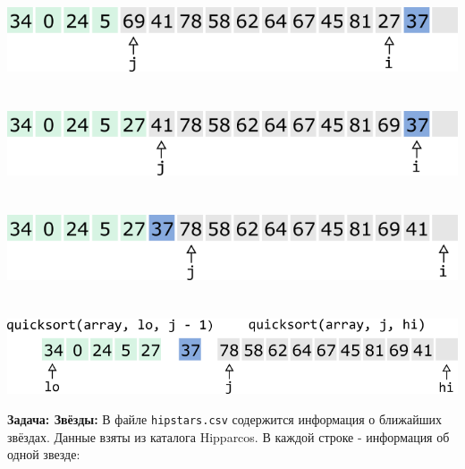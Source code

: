 \documentclass{article}
\begin{document}
\begin{multicols}{2}
\\
\\
\\
\includegraphics[scale=0.53]{../images/qs8.png}
\\
\\
\\
\includegraphics[scale=0.53]{../images/qs9.png}
\\
\\
\\
\includegraphics[scale=0.53]{../images/qs10.png}
\\
\\
\\
\includegraphics[scale=0.47]{../images/qs11.png}
\end{multicols}
\newpage
\textbf{Задача: Звёзды:} В файле \texttt{hipstars.csv} содержится информация о ближайших звёздах. Данные взяты из каталога Hipparcos. В каждой строке - информация об одной звезде:
\end{document}
